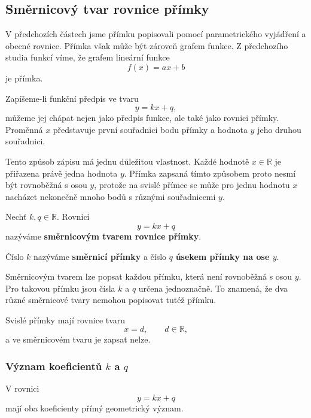 \subsection{Směrnicový tvar rovnice přímky}
\label{subsec:Slope_intercept_line_equation}

V předchozích částech jsme přímku popisovali pomocí parametrického
vyjádření a obecné rovnice. Přímka však může být zároveň grafem funkce.
Z předchozího studia funkcí víme, že grafem lineární funkce
\[
    f(x)=ax+b
\]
je přímka.

Zapíšeme-li funkční předpis ve tvaru
\[
    y=kx+q,
\]
můžeme jej chápat nejen jako předpis funkce, ale také jako rovnici
přímky. Proměnná $x$ představuje první souřadnici bodu přímky
a hodnota $y$ jeho druhou souřadnici.

Tento způsob zápisu má jednu důležitou vlastnost. Každé hodnotě
$x\in\mathbb{R}$ je přiřazena právě jedna hodnota $y$. Přímka zapsaná
tímto způsobem proto nesmí být rovnoběžná s osou $y$, protože na svislé
přímce se může pro jednu hodnotu $x$ nacházet nekonečně mnoho bodů
s různými souřadnicemi $y$.

\begin{definition}\label{def:Slope_intercept_line_equation}
    Nechť $k,q\in\mathbb{R}$. Rovnici
    \begin{equation}\label{eq:Slope_intercept_line_equation}
        y=kx+q
    \end{equation}
    nazýváme \textbf{směrnicovým tvarem rovnice přímky}.

    Číslo $k$ nazýváme \textbf{směrnicí přímky} a číslo $q$
    \textbf{úsekem přímky na ose $y$}.
\end{definition}

Směrnicovým tvarem lze popsat každou přímku, která není rovnoběžná
s osou $y$. Pro takovou přímku jsou čísla $k$ a $q$ určena jednoznačně.
To znamená, že dva různé směrnicové tvary nemohou popisovat tutéž
přímku.

Svislé přímky mají rovnice tvaru
\[
    x=d,
    \qquad d\in\mathbb{R},
\]
a ve směrnicovém tvaru je zapsat nelze.

\subsubsection{Význam koeficientů $k$ a $q$}
\label{subsubsec:Meaning_slope_intercept_coefficients}

V rovnici
\[
    y=kx+q
\]
mají oba koeficienty přímý geometrický význam.

